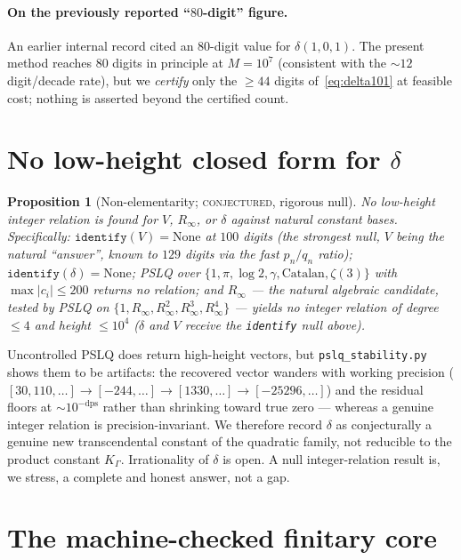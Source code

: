 \documentclass[11pt]{article}
\newtheorem{proposition}{Proposition}
\newcommand{\Rinf}{R_\infty}
\begin{document}
\paragraph{On the previously reported ``$80$-digit'' figure.}
An earlier internal record cited an $80$-digit value for $\delta(1,0,1)$. The
present method reaches $80$ digits in principle at $M=10^7$ (consistent with the
$\sim12$ digit/decade rate), but we \emph{certify} only the $\ge44$ digits
of~\eqref{eq:delta101} at feasible cost; nothing is asserted beyond the certified
count.

\section{No low-height closed form for $\delta$}\label{sec:null}

\begin{proposition}[Non-elementarity; \textsc{conjectured}, rigorous null]
\label{prop:null}
No low-height integer relation is found for $V$, $\Rinf$, or $\delta$ against
natural constant bases. Specifically: $\texttt{identify}(V)=\text{None}$ at $100$
digits (the strongest null, $V$ being the natural ``answer'', known to $129$ digits
via the fast $p_n/q_n$ ratio); $\texttt{identify}(\delta)=\text{None}$; PSLQ over
$\{1,\pi,\log2,\gamma,\text{Catalan},\zeta(3)\}$ with $\max|c_i|\le200$ returns no
relation; and $\Rinf$ --- the natural algebraic candidate, tested by PSLQ on
$\{1,\Rinf,\Rinf^2,\Rinf^3,\Rinf^4\}$ --- yields no integer relation of degree
$\le4$ and height $\le10^4$ ($\delta$ and $V$ receive the \texttt{identify} null above).
\end{proposition}

Uncontrolled PSLQ does return high-height vectors, but \texttt{pslq\_stability.py}
shows them to be artifacts: the recovered vector wanders with working precision
($[30,110,\dots]\to[-244,\dots]\to[1330,\dots]\to[-25296,\dots]$) and the residual
floors at $\sim10^{-\mathrm{dps}}$ rather than shrinking toward true zero --- whereas
a genuine integer relation is precision-invariant. We therefore record $\delta$ as
conjecturally a genuine new transcendental constant of the quadratic family, not
reducible to the product constant $K_\Gamma$. Irrationality of $\delta$ is open. A
null integer-relation result is, we stress, a complete and honest answer, not a gap.

\section{The machine-checked finitary core}\label{sec:lean}
\end{document}
